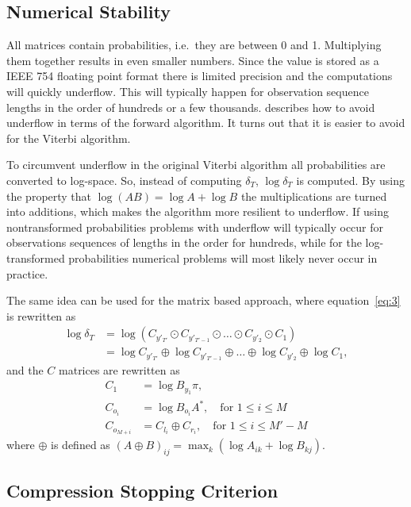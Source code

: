 \subsection{Numerical Stability}

All matrices contain probabilities, i.e.\ they are between 0 and 1. Multiplying
them together results in even smaller numbers. Since the value is stored as a
IEEE 754 floating point format there is limited precision and the computations
will quickly underflow. This will typically happen for observation sequence
lengths in the order of hundreds or a few thousands. \citet{sand2013ziphmmlib}
describes how to avoid underflow in terms of the forward algorithm. It turns
out that it is easier to avoid for the Viterbi algorithm.

To circumvent underflow in the original Viterbi algorithm all probabilities
are converted to log-space. So, instead of computing $\delta_T$,
$\log \delta_T$ is computed. By using the property that
$\log(AB) = \log A + \log B$ the multiplications are turned into additions,
which makes the algorithm more resilient to underflow. If using nontransformed
probabilities problems with underflow will typically occur for observations
sequences of lengths in the order for hundreds, while for the log-transformed
probabilities numerical problems will most likely never occur in practice.

The same idea can be used for the matrix based approach, where
equation~\eqref{eq:3} is rewritten as
\begin{align*}
  \log \delta_T &= \log \left(C_{y'_{T'}} \odot C_{y'_{T'-1}} \odot \dots \odot
                  C_{y'_2} \odot C_1 \right) \\
                &= \log C_{y'_{T'}} \oplus \log C_{y'_{T'-1}} \oplus \dots \oplus
                  \log C_{y'_2} \oplus \log C_1,
\end{align*}
and the $C$ matrices are rewritten as
\begin{align*}
  C_1 &= \log B_{y_1} \pi, \\
  C_{o_i} &= \log B_{o_i} A^*, \quad \text{for }1 \le i \le M\\
  C_{o_{M + i}} &= C_{l_i} \oplus C_{r_i} , \quad \text{for }1 \le i \le M' - M
\end{align*}
where $\oplus$ is defined as
${ \left( A \oplus B \right)}_{ij} = \max_k \left( \log A_{ik} + \log B_{kj}
\right)$.


\subsection{Compression Stopping Criterion}
\label{sec:compr-stopp-crit}

